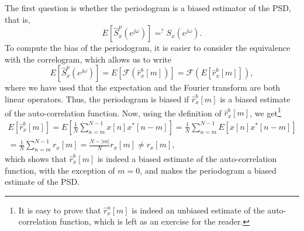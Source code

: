 The first question is whether the periodogram is a biased estimator of the PSD, that is, 
\begin{equation}
E\left[\hat{S}_x^{p}(e^{j \omega}) \right] \mathop{=}^{?} S_x(e^{j \omega}).
\end{equation}
To compute the bias of the periodogram, it is easier to consider the equivalence with the correlogram, which allows us to write
\begin{equation}
E\left[\hat{S}_x^{p}(e^{j \omega}) \right] = E\left[\mathcal{F}(\hat{r}_{x}^{b}[m]) \right] = \mathcal{F}\left(E\left[ \hat{r}_{x}^{b}[m]\right]\right),  
\end{equation}
where we have used that the expectation and the Fourier transform are both linear operators. Thus, the periodogram is biased if $\hat{r}_{x}^{b}[m]$ is a biased estimate of the auto-correlation function. Now, using the definition of  $\hat{r}_{x}^{b}[m]$, we get\footnote{It is easy to prove that $\hat{r}_{x}^{u}[m]$ is indeed an unbiased estimate of the auto-correlation function, which is left as an exercise for the reader.}
\begin{multline}
E\left[ \hat{r}_{x}^{b}[m]\right] = E\left[ \frac{1}{N} \sum_{n = m}^{N-1} x[n] x^{\ast}[n-m] \right] = \frac{1}{N} \sum_{n = m}^{N-1} E\left[ x[n] x^{\ast}[n-m] \right] \\ = \frac{1}{N} \sum_{n = m}^{N-1} r_{x}[m] = \frac{N - |m|}{N} r_{x}[m] \neq r_{x}[m],
\end{multline}
which shows that $\hat{r}_{x}^{b}[m]$ is indeed a biased estimate of the auto-correlation function, with the exception of $m = 0$, and makes the periodogram a biased estimate of the PSD.

